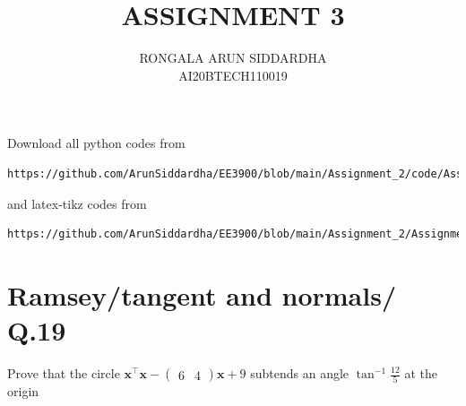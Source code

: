 \documentclass[journal,12pt,twocolumn]{IEEEtran}
\DeclareMathOperator*{\Res}{Res}
\begin{document}
\theoremstyle{remark}
\newtheorem{rem}{Remark}
\newcommand{\sgn}{\mathop{\mathrm{sgn}}}
\providecommand{\abs}[1]{\vert#1\vert}
\providecommand{\res}[1]{\Res\displaylimits_{#1}} 
\providecommand{\norm}[1]{\lVert#1\rVert}
\providecommand{\mtx}[1]{\mathbf{#1}}
\providecommand{\mean}[1]{E[ #1 ]}
\providecommand{\fourier}{\overset{\mathcal{F}}{ \rightleftharpoons}}
\providecommand{\system}{\overset{\mathcal{H}}{ \longleftrightarrow}}
\newcommand{\solution}{\noindent \textbf{Solution: }}
\newcommand{\cosec}{\,\text{cosec}\,}
\providecommand{\dec}[2]{\ensuremath{\overset{#1}{\underset{#2}{\gtrless}}}}
\newcommand{\myvec}[1]{\ensuremath{\begin{pmatrix}#1\end{pmatrix}}}
\newcommand{\mydet}[1]{\ensuremath{\begin{vmatrix}#1\end{vmatrix}}}
\makeatletter
{}
\makeatother
\let\StandardTheFigure\thefigure
\let\vec\mathbf
\renewcommand{\thefigure}{\theproblem}
\def\putbox#1#2#3{\makebox[0in][l]{\makebox[#1][l]{}\raisebox{\baselineskip}[0in][0in]{\raisebox{#2}[0in][0in]{#3}}}}
     \def\rightbox#1{\makebox[0in][r]{#1}}
     \def\centbox#1{\makebox[0in]{#1}}
     \def\topbox#1{\raisebox{-\baselineskip}[0in][0in]{#1}}
     \def\midbox#1{\raisebox{-0.5\baselineskip}[0in][0in]{#1}}
\vspace{3cm}
\title{ASSIGNMENT 3}
\author{RONGALA ARUN SIDDARDHA \\ AI20BTECH110019}
\maketitle
\newpage
\bigskip
\renewcommand{\thefigure}{\theenumi}
\renewcommand{\thetable}{\theenumi}
Download all python codes from 
\begin{lstlisting}
https://github.com/ArunSiddardha/EE3900/blob/main/Assignment_2/code/Assignment_3.py
\end{lstlisting}
%
and latex-tikz codes from 
%
\begin{lstlisting}
https://github.com/ArunSiddardha/EE3900/blob/main/Assignment_2/Assignment_3.tex
\end{lstlisting}
%
\section{Ramsey/tangent and normals/ Q.19}
Prove that the circle $\vec{x}^\top\vec{x}-\myvec{6 & 4}\vec{x} + 9$ subtends an angle $\tan^{-1}{\frac{12}{5}}$ at the origin
%
\end{document}
